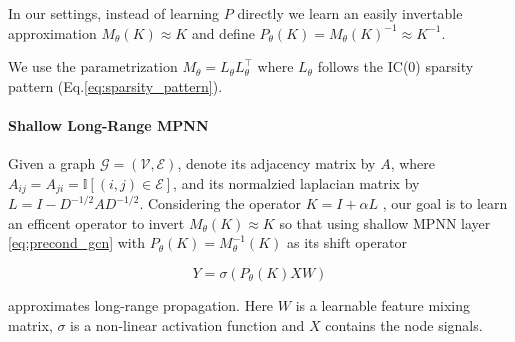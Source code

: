 In our settings, instead of learning $P$
directly we learn an easily invertable approximation $M_\theta(K) \approx K$
and define $P_\theta(K) = M_\theta(K)^{-1}\approx K^{-1}$.

We use the parametrization $M_\theta = L_\theta L_\theta^\top$ where $L_\theta$
follows the IC(0) sparsity pattern (Eq.\ref{eq:sparsity_pattern}).

\paragraph{Shallow Long-Range MPNN} Given a graph $\mathcal G = (\mathcal
    V,\mathcal E)$, denote its adjacency matrix by $A$, where $A_{ij} = A_{ji} =
    \mathbb{I}[(i,j)\in \mathcal E]$, and its normalzied laplacian matrix by $L = I
    - D^{-1/2}AD^{-1/2}$. Considering the operator $K = I + \alpha L$ , our goal is
to learn an efficent operator to invert $M_\theta(K) \approx K$ so that using
shallow MPNN layer \ref{eq:precond_gcn} with $P_\theta(K) = M_\theta^{-1}(K)$
as its shift operator

\begin{equation}\label{eq:precond_gcn}
    Y = \sigma(P_\theta(K)XW)
\end{equation}

approximates long-range propagation. Here $W$ is a learnable feature mixing
matrix, $\sigma$ is a non-linear activation function and $X$ contains the node
signals.
